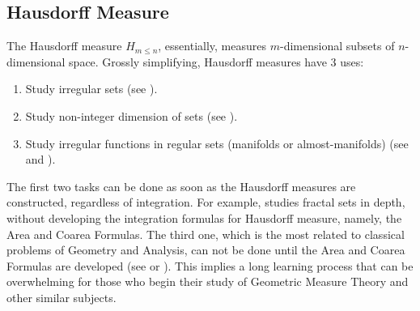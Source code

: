 \documentclass[%
 aip,
 amsmath,amssymb,
 reprint,%
jmp]{revtex4-2}
\begin{document}
\subsection{Hausdorff Measure}

The Hausdorff measure $H_{m\leq n}$, essentially, measures $m$-dimensional subsets of $n$-dimensional space. Grossly simplifying, Hausdorff measures have 3 uses:
\begin{enumerate}
    \item Study irregular sets (see \cite{Falconer}).
    \item Study non-integer dimension of sets (see \cite{Falconer}).
    \item Study irregular functions in regular sets (manifolds or almost-manifolds) (see \cite{Evans} and \cite{Krantz}).
\end{enumerate}
The first two tasks can be done as soon as the Hausdorff measures are constructed, regardless of integration. For example, \cite{Falconer} studies fractal sets in depth, without developing the integration formulas for Hausdorff measure, namely, the Area and Coarea Formulas. The third one, which is the most related to classical problems of Geometry and Analysis, can not be done until the Area and Coarea Formulas are developed (see \cite{Krantz} or \cite{Evans}). This implies a long learning process that can be overwhelming for those who begin their study of Geometric Measure Theory and other similar subjects.
\end{document}
